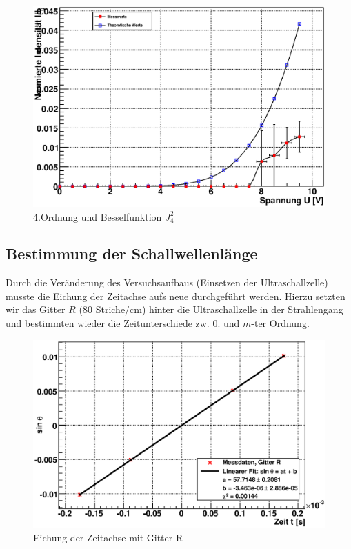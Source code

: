 \documentclass[12pt]{article}
\begin{document}
\begin{figure}[H]  
\centering
\includegraphics[width=0.9\linewidth]{pictures/raman4o.eps}
\caption{4.Ordnung und Besselfunktion $J^2_4$}
\end{figure}


\subsection{Bestimmung der Schallwellenlänge}
Durch die Veränderung des Versuchsaufbaus (Einsetzen der Ultraschallzelle) musste die Eichung der Zeitachse aufs neue durchgeführt werden.
Hierzu setzten wir das Gitter $R$ (80 Striche/cm) hinter die Ultraschallzelle in der Strahlengang und bestimmten wieder
die Zeitunterschiede zw. 0. und $m$-ter Ordnung.

\begin{figure}[H]  
\centering
\includegraphics[width=0.9\linewidth]{pictures/schall_r.eps}
\caption{Eichung der Zeitachse mit Gitter R}
\end{figure}
\end{document}
